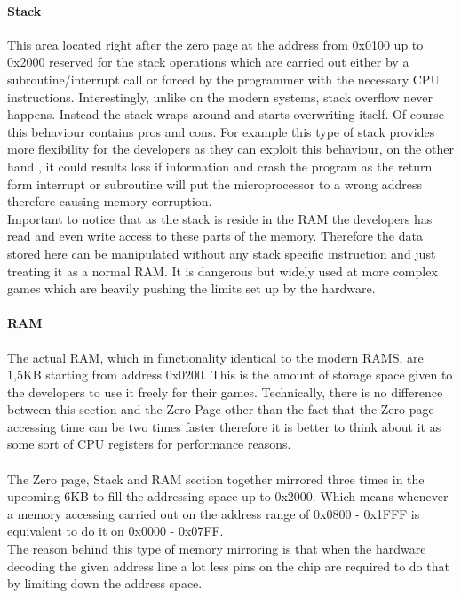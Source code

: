 \documentclass[]{report}
\begin{document}
 \paragraph{Stack}
 This area located right after the zero page at the address from 0x0100 up to 0x2000 reserved for the stack operations which are carried out either by a subroutine/interrupt call or forced by the programmer with the necessary CPU instructions. Interestingly, unlike on the modern systems, stack overflow never happens. Instead the stack wraps around and starts overwriting itself. Of course this behaviour contains pros and cons. For example this type of stack provides more flexibility for the developers as they can exploit this behaviour, on the other hand , it could results loss if information and crash the program as the return form interrupt or subroutine  will put the microprocessor to a wrong address therefore causing memory corruption.
 \\
 Important to notice that as the stack is reside in the RAM the developers has read and even write access to these parts of the memory. Therefore the data stored here can be manipulated without any stack specific instruction and just treating it as a normal RAM. It is dangerous but widely used at more complex games which are heavily pushing the limits set up by the hardware.
 
 \paragraph{RAM}
 The actual RAM, which in functionality identical to the modern RAMS, are 1,5KB starting from address 0x0200. This is the amount of storage space given to the developers to use it freely for their games. Technically, there is no difference between this section and the Zero Page other than the fact that the Zero page accessing time can be two times faster therefore it is better to think about it as some sort of CPU registers for performance reasons. 
 
 \paragraph{ }
 The Zero page, Stack and RAM section together mirrored three times in the upcoming 6KB to fill the addressing space up to 0x2000. Which means whenever a memory accessing carried out on the address range of 0x0800 - 0x1FFF is equivalent to do it on 0x0000 - 0x07FF.
 \\
 The reason behind this type of memory mirroring is that when the hardware decoding the given address line a lot less pins on the chip are required to do that by limiting down the address space.
 
\end{document}
